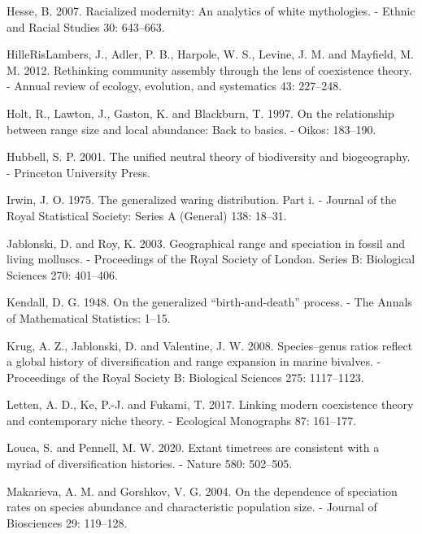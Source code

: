 \documentclass[
  letterpaper,
  DIV=11,
  numbers=noendperiod]{scrartcl}
\newlength{\cslhangindent}
\newenvironment{CSLReferences}[2] %
 {\begin{list}{}{%
  \setlength{\itemindent}{0pt}
  \setlength{\leftmargin}{0pt}
  \setlength{\parsep}{0pt}
  \ifodd #1
   \setlength{\leftmargin}{\cslhangindent}
   \setlength{\itemindent}{-1\cslhangindent}
  \fi
  \setlength{\itemsep}{#2\baselineskip}}}
 {\end{list}}
\begin{document}
\begin{CSLReferences}{1}{1}
Hesse, B. 2007. Racialized modernity: An analytics of white mythologies.
- Ethnic and Racial Studies 30: 643--663.

HilleRisLambers, J., Adler, P. B., Harpole, W. S., Levine, J. M. and
Mayfield, M. M. 2012. Rethinking community assembly through the lens of
coexistence theory. - Annual review of ecology, evolution, and
systematics 43: 227--248.

Holt, R., Lawton, J., Gaston, K. and Blackburn, T. 1997. On the
relationship between range size and local abundance: Back to basics. -
Oikos: 183--190.

Hubbell, S. P. 2001. The unified neutral theory of biodiversity and
biogeography. - Princeton University Press.

Irwin, J. O. 1975. The generalized waring distribution. Part i. -
Journal of the Royal Statistical Society: Series A (General) 138:
18--31.

Jablonski, D. and Roy, K. 2003. Geographical range and speciation in
fossil and living molluscs. - Proceedings of the Royal Society of
London. Series B: Biological Sciences 270: 401--406.

Kendall, D. G. 1948. On the generalized {``birth-and-death''} process. -
The Annals of Mathematical Statistics: 1--15.

Krug, A. Z., Jablonski, D. and Valentine, J. W. 2008. Species--genus
ratios reflect a global history of diversification and range expansion
in marine bivalves. - Proceedings of the Royal Society B: Biological
Sciences 275: 1117--1123.

Letten, A. D., Ke, P.-J. and Fukami, T. 2017. Linking modern coexistence
theory and contemporary niche theory. - Ecological Monographs 87:
161--177.

Louca, S. and Pennell, M. W. 2020. Extant timetrees are consistent with
a myriad of diversification histories. - Nature 580: 502--505.

Makarieva, A. M. and Gorshkov, V. G. 2004. On the dependence of
speciation rates on species abundance and characteristic population
size. - Journal of Biosciences 29: 119--128.


\end{CSLReferences}
\end{document}
